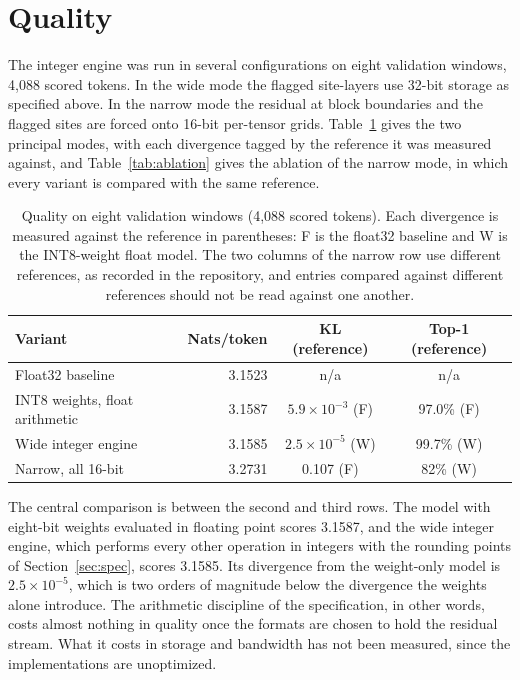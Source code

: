 \documentclass[11pt]{article}
\begin{document}
\section{Quality}
\label{sec:quality}

The integer engine was run in several configurations on eight validation windows, 4,088 scored tokens. In the wide mode the flagged site-layers use 32-bit storage as specified above. In the narrow mode the residual at block boundaries and the flagged sites are forced onto 16-bit per-tensor grids. Table~\ref{tab:quality} gives the two principal modes, with each divergence tagged by the reference it was measured against, and Table~\ref{tab:ablation} gives the ablation of the narrow mode, in which every variant is compared with the same reference.

\begin{table}[h]
\centering
\footnotesize
\setlength{\tabcolsep}{5pt}
\begin{tabular}{lrcc}
\toprule
Variant & Nats/token & KL (reference) & Top-1 (reference) \\
\midrule
Float32 baseline & 3.1523 & n/a & n/a \\
INT8 weights, float arithmetic & 3.1587 & $5.9\times10^{-3}$ (F) & 97.0\% (F) \\
Wide integer engine & 3.1585 & $2.5\times10^{-5}$ (W) & 99.7\% (W) \\
Narrow, all 16-bit & 3.2731 & 0.107 (F) & 82\% (W) \\
\bottomrule
\end{tabular}
\caption{Quality on eight validation windows (4,088 scored tokens). Each divergence is measured against the reference in parentheses: F is the float32 baseline and W is the INT8-weight float model. The two columns of the narrow row use different references, as recorded in the repository, and entries compared against different references should not be read against one another.}
\label{tab:quality}
\end{table}

The central comparison is between the second and third rows. The model with eight-bit weights evaluated in floating point scores 3.1587, and the wide integer engine, which performs every other operation in integers with the rounding points of Section~\ref{sec:spec}, scores 3.1585. Its divergence from the weight-only model is $2.5\times10^{-5}$, which is two orders of magnitude below the divergence the weights alone introduce. The arithmetic discipline of the specification, in other words, costs almost nothing in quality once the formats are chosen to hold the residual stream. What it costs in storage and bandwidth has not been measured, since the implementations are unoptimized.
\end{document}
